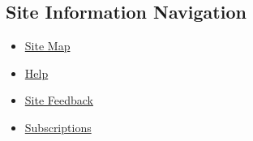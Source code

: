 \hypertarget{site-information-navigation-1}{%
\subsection{Site Information
Navigation}\label{site-information-navigation-1}}

\begin{itemize}
\tightlist
\item
  \href{https://spiderbites.nytimes3xbfgragh.onion}{Site Map}
\item
  \href{https://help.nytimes3xbfgragh.onion/hc/en-us}{Help}
\item
  \href{https://help.nytimes3xbfgragh.onion/hc/en-us/articles/115015385887-Contact-Us?redir=myacc}{Site
  Feedback}
\item
  \href{https://www.nytimes3xbfgragh.onion/subscription?campaignId=37WXW}{Subscriptions}
\end{itemize}
